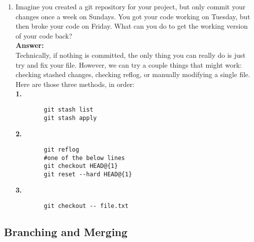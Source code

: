 \documentclass[10pt,twocolumn]{article}
\begin{document}
\begin{enumerate}
\item Imagine you created a git repository for your project, but only commit your changes once a week on Sundays. You got your code working on Tuesday, but then broke your code on Friday. What can you do to get the working version of your code back?\\
    \textbf{Answer:}\\
    Technically, if nothing is committed, the only thing you can really do is just try and fix your file. However, we can try a couple things that might work: checking stashed changes, checking reflog, or manually modifying a single file. Here are those three methods, in order:\\
    \textbf{1.}
    \begin{verbatim}
        git stash list
        git stash apply 
    \end{verbatim}
    \textbf{2.}
    \begin{verbatim}
        git reflog
        #one of the below lines
        git checkout HEAD@{1}
        git reset --hard HEAD@{1} 
    \end{verbatim}
    \textbf{3.}
    \begin{verbatim}
        git checkout -- file.txt
    \end{verbatim}

\end{enumerate}

\subsection{Branching and Merging}
\end{document}
